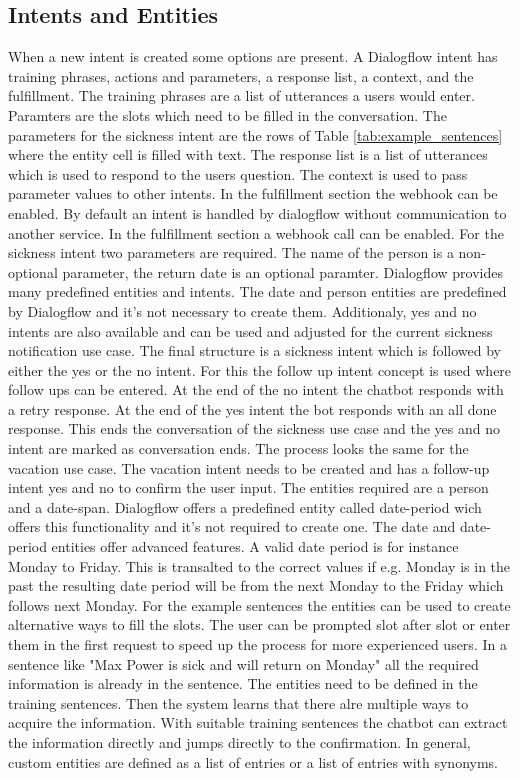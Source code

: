 \subsection{Intents and Entities}
When a new intent is created some options are present.
A Dialogflow intent has training phrases, actions and parameters,
a response list, a context, and the fulfillment.
The training phrases are a list of utterances a users would enter.
Paramters are the slots which need to be filled in the conversation.
The parameters for the sickness intent are the rows of Table \ref{tab:example_sentences} where the entity cell is 
filled with text.
The response list is a list of utterances which is used to respond to the users question.
The context is used to pass parameter values to other intents.
In the fulfillment section the webhook can be enabled.
By default an intent is handled by dialogflow without communication to another service.
In the fulfillment section a webhook call can be enabled.
For the sickness intent two parameters are required.
The name of the person is a non-optional parameter,
the return date is an optional paramter.
Dialogflow provides many predefined entities and intents.
The date and person entities are predefined by Dialogflow and it's 
not necessary to create them.
Additionaly, yes and no intents are also available and can be used and 
adjusted for the current sickness notification use case.
The final structure is a sickness intent which is followed by either 
the yes or the no intent.
For this the follow up intent concept is used where follow ups can 
be entered.
At the end of the no intent the chatbot responds with a retry response.
At the end of the yes intent the bot responds with an all done response.
This ends the conversation of the sickness use case and the yes and no 
intent are marked as conversation ends.
The process looks the same for the vacation use case.
The vacation intent needs to be created and has a follow-up intent 
yes and no to confirm the user input.
The entities required are a person and a date-span.
Dialogflow offers a predefined entity called date-period wich offers this 
functionality and it's not required to create one.
The date and date-period entities offer advanced features.
A valid date period is for instance Monday to Friday.
This is transalted to the correct values if e.g. Monday is in the past
the resulting date period will be from the next Monday to the Friday 
which follows next Monday.
For the example sentences the entities can be used to create alternative ways to fill the slots.
The user can be prompted slot after slot or enter them in the first request to speed up the 
process for more experienced users.
In a sentence like "Max Power is sick and will return on Monday" all the required information is 
already in the sentence. 
The entities need to be defined in the training sentences.
Then the system learns that there alre multiple ways to acquire the information.
With suitable training sentences the chatbot can extract the information 
directly and jumps directly to the confirmation.  
In general, custom entities are defined as a list of entries or a list of entries with 
synonyms.

